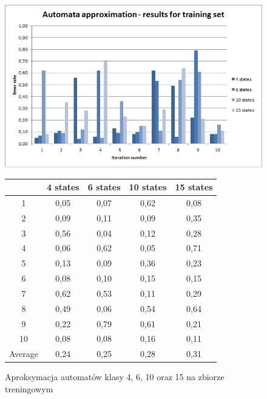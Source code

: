 \documentclass[runningheads,a4paper]{llncs}
\begin{document}
\begin{figure}[!htb]
\includegraphics[scale=1]{6.png}
\endminipage\hfill
{}
\renewcommand{\arraystretch}{1.5}%
\begin{tabular}{@{}ccccc@{}}
\toprule
        & 4 states & 6 states & 10 states & 15 states \\ \midrule
1       & 0,05     & 0,07     & 0,62      & 0,08      \\
2       & 0,09     & 0,11     & 0,09      & 0,35      \\
3       & 0,56     & 0,04     & 0,12      & 0,28      \\
4       & 0,06     & 0,62     & 0,05      & 0,71      \\
5       & 0,13     & 0,09     & 0,36      & 0,23      \\
6       & 0,08     & 0,10     & 0,15      & 0,15        \\
7       & 0,62     & 0,53     & 0,11      & 0,29        \\
8       & 0,49     & 0,06     & 0,54      & 0,64         \\
9       & 0,22     & 0,79     & 0,61      & 0,21     \\
10      & 0,08     & 0,08     & 0,16      & 0,11      \\ \bottomrule
Average & 0,24     & 0,25     & 0,28      & 0,31      \\ \bottomrule
\end{tabular}
\vspace{4mm}
\endminipage\hfill
\caption{Aproksymacja automatów klasy 4, 6, 10 oraz 15 na zbiorze treningowym}
\end{figure}

\newpage
\end{document}
